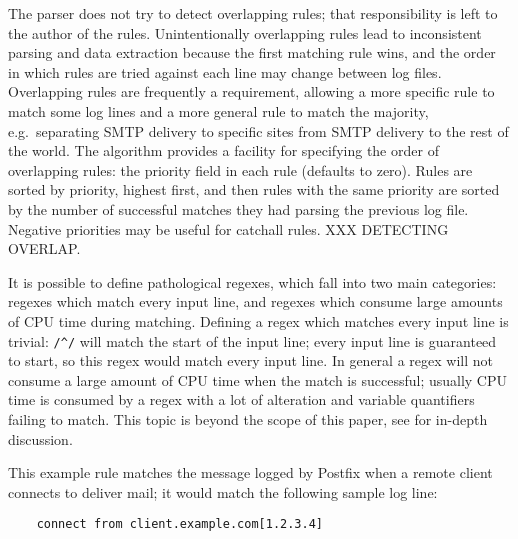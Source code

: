 \documentclass[draft]{svmult}
\begin{document}
The parser does not try to detect overlapping rules; that responsibility is
left to the author of the rules.  Unintentionally overlapping rules lead to
inconsistent parsing and data extraction because the first matching rule
wins, and the order in which rules are tried against each line may change
between log files.  Overlapping rules are frequently a requirement,
allowing a more specific rule to match some log lines and a more general
rule to match the majority, e.g.\ separating SMTP delivery to specific
sites from SMTP delivery to the rest of the world.  The algorithm provides
a facility for specifying the order of overlapping rules: the priority
field in each rule (defaults to zero).  Rules are sorted by priority,
highest first, and then rules with the same priority are sorted by the
number of successful matches they had parsing the previous log file.
Negative priorities may be useful for catchall rules.  XXX DETECTING
OVERLAP\@.

It is possible to define pathological regexes, which fall into two main
categories: regexes which match every input line, and regexes which consume
large amounts of CPU time during matching.  Defining a regex which matches
every input line is trivial: \verb!/^/! will match the start of the input
line; every input line is guaranteed to start, so this regex would match
every input line.  In general a regex will not consume a large amount of
CPU time when the match is successful; usually CPU time is consumed by a
regex with a lot of alteration and variable quantifiers failing to match.
This topic is beyond the scope of this paper, see
\cite{mastering-regular-expressions} for in-depth discussion.

\label{example rule}

This example rule matches the message logged by Postfix when a remote
client connects to deliver mail; it would match the following sample log
line:

\begin{verbatim}
    connect from client.example.com[1.2.3.4]
\end{verbatim}
\end{document}
